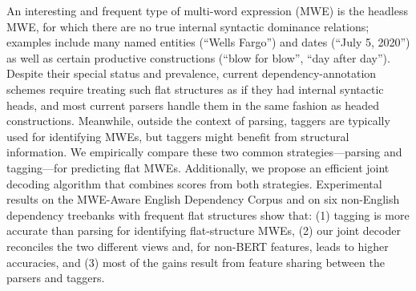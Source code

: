 An interesting and frequent type of multi-word expression (MWE) is the headless MWE, for which there are no true internal syntactic dominance relations; examples include many named entities (``Wells Fargo'') and dates (``July 5, 2020'') as well as certain productive constructions (``blow for blow'', ``day after day''). Despite their special status and prevalence, current dependency-annotation schemes require treating such flat structures as if they had internal syntactic heads, and most current parsers handle them in the same fashion as headed constructions. Meanwhile, outside the context of parsing, taggers are typically used for identifying MWEs, but taggers might benefit from structural information. We empirically compare these two common strategies—parsing and tagging—for predicting flat MWEs. Additionally, we propose an efficient joint decoding algorithm that combines scores from both strategies. Experimental results on the MWE-Aware English Dependency Corpus and on six non-English dependency treebanks with frequent flat structures show that: (1) tagging is more accurate than parsing for identifying flat-structure MWEs, (2) our joint decoder reconciles the two different views and, for non-BERT features, leads to higher accuracies, and (3) most of the gains result from feature sharing between the parsers and taggers.
